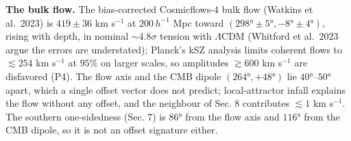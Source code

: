 \documentclass[
]{article}
\begin{document}
\textbf{The bulk flow.} The bias-corrected Cosmicflows-4 bulk flow
(Watkins et al.~2023) is \(419 \pm 36\) km s\(^{-1}\) at \(200\,h^{-1}\)
Mpc toward \((298° \pm 5°, -8° \pm 4°)\), rising with depth, in nominal
\(\sim\!4.8\sigma\) tension with \(\Lambda\)CDM (Whitford et al.~2023
argue the errors are understated); Planck's kSZ analysis limits coherent
flows to \(\lesssim 254\) km s\(^{-1}\) at \(95\%\) on larger scales, so
amplitudes \(\gtrsim 600\) km s\(^{-1}\) are disfavored (P4). The flow
axis and the CMB dipole \((264°, +48°)\) lie \(40°\)--\(50°\) apart,
which a single offset vector does not predict; local-attractor infall
explains the flow without any offset, and the neighbour of Sec. 8
contributes \(\lesssim 1\) km s\(^{-1}\). The southern one-sidedness
(Sec. 7) is \(86°\) from the flow axis and \(116°\) from the CMB dipole,
so it is not an offset signature either.
\end{document}
